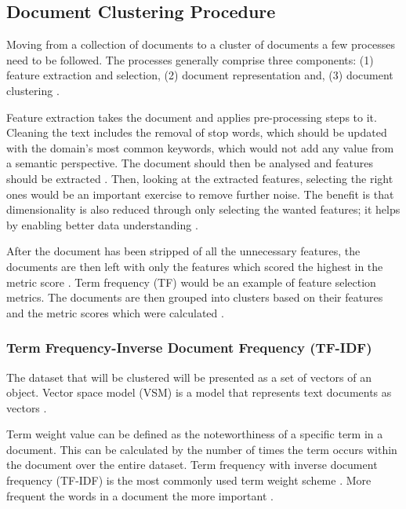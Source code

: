 \subsection{Document Clustering Procedure}

Moving from a collection of documents to a cluster of documents a few processes need to be followed. The processes generally comprise three components: (1) feature extraction and selection, (2) document representation and, (3) document clustering \cite{shah2012document}.

Feature extraction takes the document and applies pre-processing steps to it. Cleaning the text includes the removal of stop words, which should be updated with the domain’s most common keywords, which would not add any value from a semantic perspective. The document should then be analysed and features should be extracted \cite{mugunthadevi2011survey}. Then, looking at the extracted features, selecting the right ones would be an important exercise to remove further noise. The benefit is that dimensionality is also reduced through only selecting the wanted features; it helps by enabling better data understanding \cite{wei2006combining}.

After the document has been stripped of all the unnecessary features, the documents are then left with only the features which scored the highest in the metric score \cite{shah2012document}. Term frequency (TF) would be an example of feature selection metrics. The documents are then grouped into clusters based on their features and the metric scores which were calculated \cite{wei2006combining}.

\subsubsection{Term Frequency-Inverse Document Frequency (TF-IDF)}

The dataset that will be clustered will be presented as a set of vectors of an object. Vector space model (VSM) is a model that represents text documents as vectors \cite{clark2015vector}.

Term weight value can be defined as the noteworthiness of a specific term in a document. This can be calculated by the number of times the term occurs within the document over the entire dataset. Term frequency with inverse document frequency (TF-IDF) is the most commonly used term weight scheme \cite{cui2005document}. More frequent the words in a document the more important \cite{peng2006recent}.

